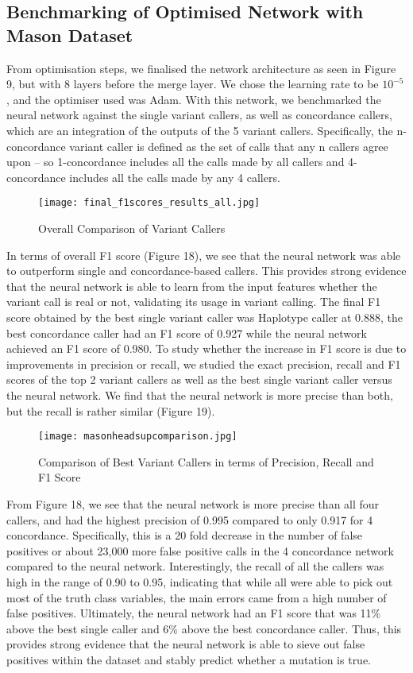 \documentclass{article}
\begin{document}
\subsection{Benchmarking of Optimised Network with Mason Dataset}
From optimisation steps, we finalised the network architecture as seen in Figure 9, but with 8 layers before the merge layer. We chose the learning rate to be $10^{-5}$, and the optimiser used was Adam. With this network, we benchmarked the neural network against the single variant callers, as well as concordance callers, which are an integration of the outputs of the 5 variant callers. Specifically, the n-concordance variant caller is defined as the set of calls that any n callers agree upon -- so 1-concordance includes all the calls made by all callers and 4-concordance includes all the calls made by any 4 callers.
\begin{figure}[H]
\texttt{[image: final\_f1scores\_results\_all.jpg]}
\caption{Overall Comparison of Variant Callers}
\centering
\end{figure}
In terms of overall F1 score (Figure 18), we see that the neural network was able to outperform single and concordance-based callers. This provides strong evidence that the neural network is able to learn from the input features whether the variant call is real or not, validating its usage in variant calling. The final F1 score obtained by the best single variant caller was Haplotype caller at 0.888, the best concordance caller had an F1 score of 0.927 while the neural network achieved an F1 score of 0.980. To study whether the increase in F1 score is due to improvements in precision or recall, we studied the exact precision, recall and F1 scores of the top 2 variant callers as well as the best single variant caller versus the neural network. We find that the neural network is more precise than both, but the recall is rather similar (Figure 19). 
\begin{figure}[H]
\texttt{[image: masonheadsupcomparison.jpg]}
\caption{Comparison of Best Variant Callers in terms of Precision, Recall and F1 Score}
\centering
\end{figure}
From Figure 18, we see that the neural network is more precise than all four callers, and had the highest precision of 0.995 compared to only 0.917 for 4 concordance. Specifically, this is a 20 fold decrease in the number of false positives or about 23,000 more false positive calls in the 4 concordance network compared to the neural network. Interestingly, the recall of all the callers was high in the range of 0.90 to 0.95, indicating that while all were able to pick out most of the truth class variables, the main errors came from a high number of false positives. Ultimately, the neural network had an F1 score that was 11\% above the best single caller and 6\% above the best concordance caller. Thus, this provides strong evidence that the neural network is able to sieve out false positives within the dataset and stably predict whether a mutation is true.
\end{document}
